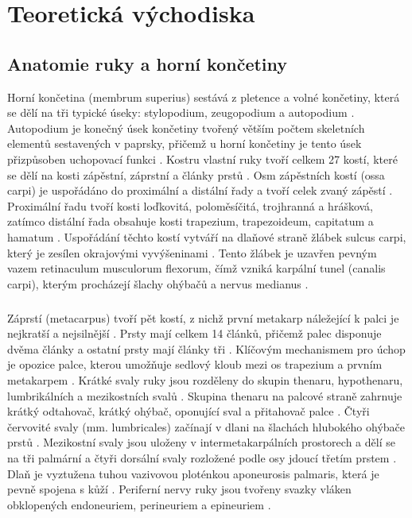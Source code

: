 \chapter{Teoretická východiska}

\section{Anatomie ruky a horní končetiny}

Horní končetina (membrum superius) sestává z pletence a volné končetiny, která se dělí na tři typické úseky: stylopodium, zeugopodium a autopodium \cite{Cihak2011}. Autopodium je konečný úsek končetiny tvořený větším počtem skeletních elementů sestavených v paprsky, přičemž u horní končetiny je tento úsek přizpůsoben uchopovací funkci \cite{Cihak2011}. Kostru vlastní ruky tvoří celkem 27 kostí, které se dělí na kosti zápěstní, záprstní a články prstů \cite{Stuchla2024}. Osm zápěstních kostí (ossa carpi) je uspořádáno do proximální a distální řady a tvoří celek zvaný zápěstí \cite{Cihak2011}. Proximální řadu tvoří kosti loďkovitá, poloměsíčitá, trojhranná a hrášková, zatímco distální řada obsahuje kosti trapezium, trapezoideum, capitatum a hamatum \cite{Stuchla2024}. Uspořádání těchto kostí vytváří na dlaňové straně žlábek sulcus carpi, který je zesílen okrajovými vyvýšeninami \cite{Cihak2011}. Tento žlábek je uzavřen pevným vazem retinaculum musculorum flexorum, čímž vzniká karpální tunel (canalis carpi), kterým procházejí šlachy ohýbačů a nervus medianus \cite{Cihak2011}.
\paragraph{}Záprstí (metacarpus) tvoří pět kostí, z nichž první metakarp náležející k palci je nejkratší a nejsilnější \cite{Cihak2011}. Prsty mají celkem 14 článků, přičemž palec disponuje dvěma články a ostatní prsty mají články tři \cite{Stuchla2024}. Klíčovým mechanismem pro úchop je opozice palce, kterou umožňuje sedlový kloub mezi os trapezium a prvním metakarpem \cite{Cihak2011}. Krátké svaly ruky jsou rozděleny do skupin thenaru, hypothenaru, lumbrikálních a mezikostních svalů \cite{Stuchla2024}. Skupina thenaru na palcové straně zahrnuje krátký odtahovač, krátký ohýbač, oponující sval a přitahovač palce \cite{Cihak2011}. Čtyři červovité svaly (mm. lumbricales) začínají v dlani na šlachách hlubokého ohýbače prstů \cite{Cihak2011}. Mezikostní svaly jsou uloženy v intermetakarpálních prostorech a dělí se na tři palmární a čtyři dorsální svaly rozložené podle osy jdoucí třetím prstem \cite{Cihak2011}. Dlaň je vyztužena tuhou vazivovou ploténkou aponeurosis palmaris, která je pevně spojena s kůží \cite{Cihak2011}. Periferní nervy ruky jsou tvořeny svazky vláken obklopených endoneuriem, perineuriem a epineuriem \cite{Cihak2016}.

